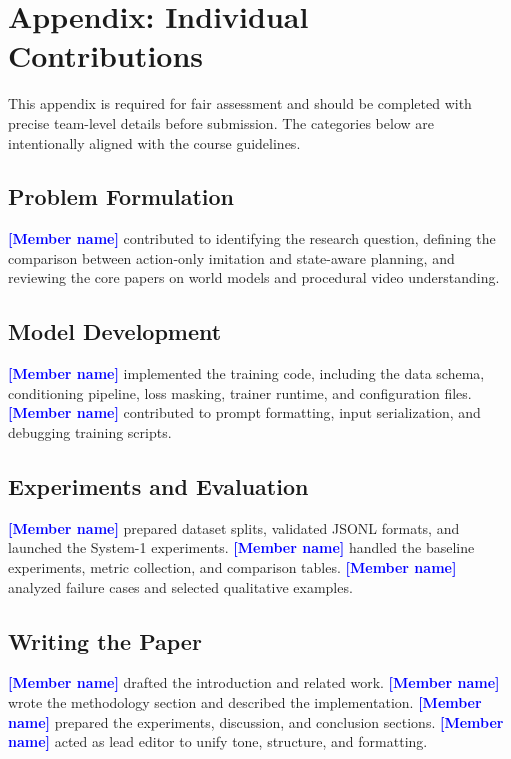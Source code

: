 \documentclass[11pt]{article}
\newcommand{\fillme}[1]{\textcolor{blue}{[#1]}}
\begin{document}



\clearpage
\appendix
\section{Appendix: Individual Contributions}
This appendix is required for fair assessment and should be completed with precise team-level details before submission. The categories below are intentionally aligned with the course guidelines.

\subsection{Problem Formulation}
\textbf{\fillme{Member name}} contributed to identifying the research question, defining the comparison between action-only imitation and state-aware planning, and reviewing the core papers on world models and procedural video understanding.

\subsection{Model Development}
\textbf{\fillme{Member name}} implemented the training code, including the data schema, conditioning pipeline, loss masking, trainer runtime, and configuration files. \textbf{\fillme{Member name}} contributed to prompt formatting, input serialization, and debugging training scripts.

\subsection{Experiments and Evaluation}
\textbf{\fillme{Member name}} prepared dataset splits, validated JSONL formats, and launched the System-1 experiments. \textbf{\fillme{Member name}} handled the baseline experiments, metric collection, and comparison tables. \textbf{\fillme{Member name}} analyzed failure cases and selected qualitative examples.

\subsection{Writing the Paper}
\textbf{\fillme{Member name}} drafted the introduction and related work. \textbf{\fillme{Member name}} wrote the methodology section and described the implementation. \textbf{\fillme{Member name}} prepared the experiments, discussion, and conclusion sections. \textbf{\fillme{Member name}} acted as lead editor to unify tone, structure, and formatting.
\end{document}
